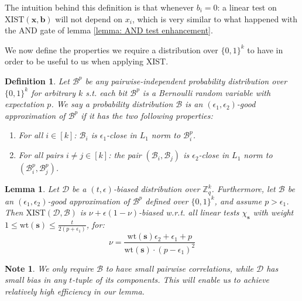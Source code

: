 \documentclass[12pt]{article}
\newtheorem{definition}{Definition}[section]
\newtheorem{lemma}[theorem]{Lemma}
\newtheorem{note}[theorem]{Note}
\newcommand{\zo}[1]{\{0,1\}^{#1}}
\newcommand{\dist}{\mathcal{D}}
\newcommand{\XIST}{\mathrm{XIST} }
\renewcommand{\B}{\mathcal{B}}
\newcommand{\Z}{\mathbb{Z}}
\renewcommand{\vec}[1]{\bm{#1}}
\newcommand{\wt}[1]{\mathrm{wt}\left(#1\right)}
\begin{document}
	The intuition behind this definition is that whenever $b_i = 0$: a linear test on $\XIST(\vec{x},\vec{b})$ will not depend on $x_i$, which is very similar to what happened with the AND gate of lemma \ref{lemma: AND test enhancement}.
	
	We now define the properties we require a distribution over $\zo{k}$ to have in order to be useful to us when applying XIST.
	\begin{definition}
		Let $\B^p$ be any pairwise-independent probability distribution over $\zo{k}$ for arbitrary $k$ s.t. each bit $\B^p$ is a Bernoulli random variable with expectation $p$.
		We say a probability distribution $\B$ is an \emph{$(\epsilon_1, \epsilon_2)$-good} approximation of $\B^p$ if it has the two following properties:
		\begin{enumerate}
			\item For all $i \in \left[ k \right]$: $\B_i$ is $\epsilon_1$-close in $L_1$ norm to $\B^p_i$.
			\item For all pairs $i \neq j \in \left[ k \right]$: the pair $(\B_i, \B_j)$ is $\epsilon_2$-close in $L_1$ norm to $(\B^p_i, \B^p_j)$.
		\end{enumerate}
	\end{definition}
	
	\begin{lemma} \label{lemma: XIST test enhancement}
		Let $\dist$ be a $(t, \epsilon)$-biased distribution over $\Z_q^k$.
		Furthermore, let $\B$ be an $(\epsilon_1, \epsilon_2)$-good approximation of $\B^p$ defined over $\{0,1\}^k$, and assume $p > \epsilon_1$.
		Then $\XIST(\dist, \B)$ is $\nu + \epsilon(1 - \nu)$-biased w.r.t. all linear tests $\chi_{\vec{s}}$
			with weight $1 \leq \wt{\vec{s}} \leq \frac{t}{2 \left( p + \epsilon_1 \right)}$, for:
		\begin{equation*}
			\nu	= \frac{\wt{\vec{s}}\epsilon_2 + \epsilon_1 + p}{\wt{\vec{s}} \cdot (p - \epsilon_1)^2}
		\end{equation*}
	\end{lemma}
	
	\begin{note}
		We only require $\B$ to have small \emph{pairwise} correlations, while $\dist$ has small bias in any $t$-tuple of its components.
		This will enable us to achieve relatively high efficiency in our lemma.
	\end{note}
	
\end{document}

